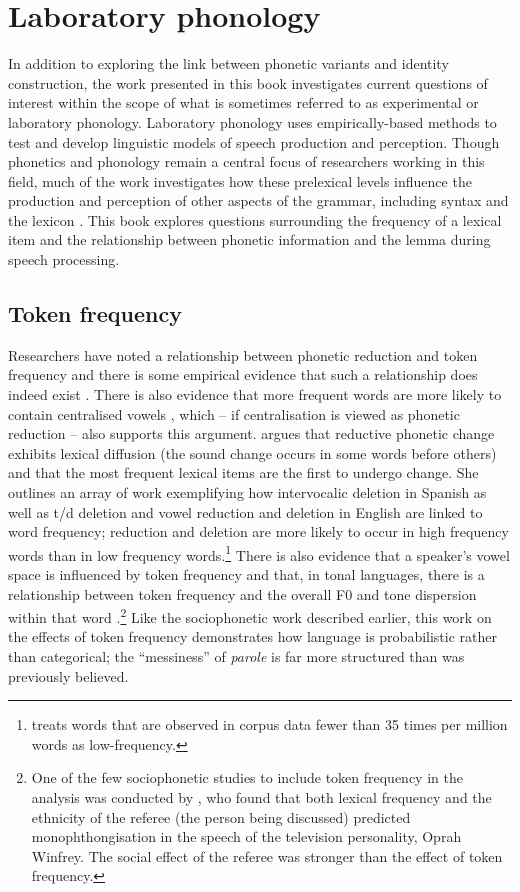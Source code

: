 \section{Laboratory phonology}
In addition to exploring the link between phonetic variants and identity construction, the work presented in this book investigates current questions of interest within the scope of what is sometimes referred to as experimental or laboratory phonology. Laboratory phonology uses empirically-based methods to test and develop linguistic models of speech production and perception. Though phonetics and phonology remain a central focus of researchers working in this field, much of the work investigates how these prelexical levels influence the production and perception of other aspects of the grammar, including syntax \citep{haybresnan2006} and the lexicon \citep{bybee2002,gahl-thyme}. This book explores questions surrounding the frequency of a lexical item and the relationship between phonetic information and the lemma during speech processing.
 
	
	\subsection{Token frequency}\label{sec:frequency}
Researchers have noted a relationship between phonetic reduction and token frequency \citep{bybee2001,zipf1929} and there is some empirical evidence that such a relationship does indeed exist \citep{aylettturk2004,bakerbradlow2009,belletal2009}. There is also evidence that more frequent words are more likely to contain centralised vowels \citep{aylettturk2006,munsonsolomon2004}, which -- if centralisation is viewed as phonetic reduction -- also supports this argument. \citet{bybee2002} argues that reductive phonetic change exhibits lexical diffusion (the sound change occurs in some words before others) and that the most frequent lexical items are the first to undergo change. She outlines an array of work exemplifying how intervocalic  deletion in Spanish as well as t/d deletion and vowel reduction and deletion in English are linked to word frequency; reduction and deletion are more likely to occur in high frequency words than in low frequency words.\footnote{\citet{bybee2002} treats words that are observed in corpus data fewer than 35 times per million words as low-frequency.} There is also evidence that a speaker's vowel space is influenced by token frequency \citep{munson2007} and that, in tonal languages, there is a relationship between token frequency and the overall F0 and tone dispersion within that word \citep{zhaojurafsky2007}.\footnote{One of the few sociophonetic studies to include token frequency in the analysis was conducted by \citet{oprah1999}, who found that both lexical frequency and the ethnicity of the referee (the person being discussed) predicted  monophthongisation in the speech of the television personality, Oprah Winfrey. The social effect of the referee was stronger than the effect of token frequency.} Like the sociophonetic work described earlier, this work on the effects of token frequency demonstrates how language is probabilistic rather than categorical; the ``messiness'' of \textit{parole} is far more structured than was previously believed.

